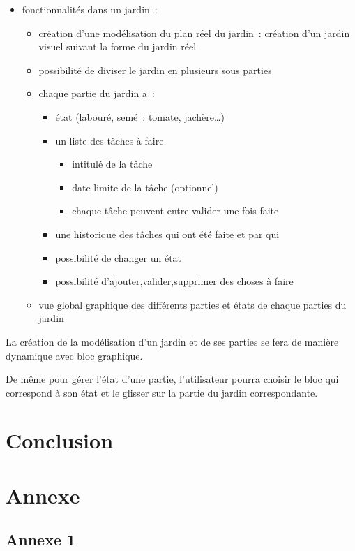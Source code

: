 \documentclass[french,a4paper]{article}
\begin{document}
\begin{itemize}
\begin{itemize}
          \end{itemize}
    \item fonctionnalités dans un jardin~:
          \begin{itemize}
              \item création d’une modélisation du plan réel du jardin~: création d’un jardin visuel suivant la forme du jardin réel
              \item  possibilité de diviser le jardin en plusieurs sous parties
              \item chaque partie du jardin a~:
                    \begin{itemize}
                        \item état (labouré, semé~: tomate, jachère…)
                        \item un liste des tâches à faire
                              \begin{itemize}
                                  \item intitulé de la tâche
                                  \item date limite de la tâche (optionnel)
                                  \item chaque tâche peuvent entre valider une fois faite
                              \end{itemize}
                        \item une historique des tâches qui ont été faite et par qui
                        \item possibilité de changer un état
                        \item possibilité d’ajouter,valider,supprimer des choses à faire
                    \end{itemize}
              \item vue global graphique des différents parties et états de chaque parties du jardin
          \end{itemize}
\end{itemize}
La création de la modélisation d’un jardin et de ses parties se fera de manière dynamique avec bloc graphique.

De même pour gérer l’état d’une partie, l’utilisateur pourra choisir le bloc qui correspond à son état et le glisser sur la partie du jardin correspondante.

\section{Conclusion}

\section{Annexe}
\subsection[Annexe1]{Annexe 1\hypertarget{annexe1}{}}



\end{document}
